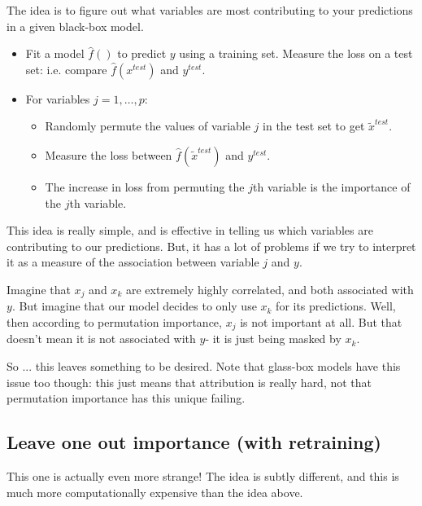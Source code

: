 The idea is to figure out what variables are most contributing to your predictions in a given black-box model.

\begin{itemize}
\item Fit a model $\hat{f}()$ to predict $y$ using a training set. Measure the loss on a test set: i.e. compare $\hat{f}(x^{test})$ and $y^{test}$.
\item For variables $j=1,\ldots,p$:
\begin{itemize}
\item Randomly permute the values of variable $j$ in the test set to get $\tilde{x}^{test}$.
\item Measure the loss between $\hat{f}(\tilde{x}^{test})$ and $y^{test}$. 
\item The increase in loss from permuting the $j$th variable is the importance of the $j$th variable. 
\end{itemize}
\end{itemize}

This idea is really simple, and is effective in telling us which variables are contributing to our predictions. But, it has a lot of problems if we try to interpret it as a measure of the association between variable $j$ and $y$.

Imagine that $x_j$ and $x_k$ are extremely highly correlated, and both associated with $y$. But imagine that our model decides to only use $x_k$ for its predictions. Well, then according to permutation importance, $x_j$ is not important at all. But that doesn't mean it is not associated with $y$- it is just being masked by $x_k$. 

So ... this leaves something to be desired. Note that glass-box models have this issue too though: this just means that attribution is really hard, not that permutation importance has this unique failing.


\subsection{Leave one out importance (with retraining)}

This one is actually even more strange! The idea is subtly different, and this is much more computationally expensive than the idea above.

